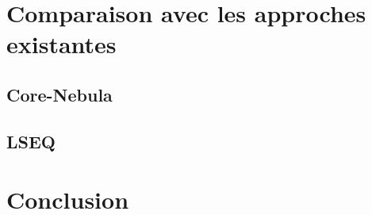
\section{Comparaison avec les approches existantes}

\subsection{Core-Nebula}


\subsection{LSEQ}






\section{Conclusion}

